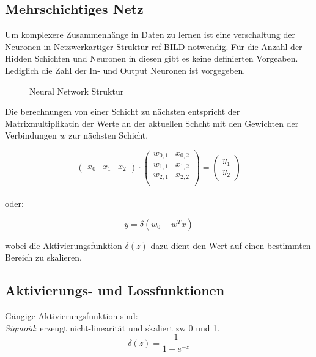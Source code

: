 \subsection{Mehrschichtiges Netz}

Um komplexere Zusammenhänge in Daten zu lernen ist eine verschaltung der Neuronen in Netzwerkartiger Struktur ref BILD
notwendig. Für die Anzahl der Hidden Schichten und Neuronen in diesen gibt es keine definierten Vorgeaben. Lediglich 
die Zahl der In- und Output Neuronen ist vorgegeben.

\begin{figure}
    \centering
    
    \caption{Neural Network Struktur}
    \label{fig:nn}
\end{figure}

Die berechnungen von einer Schicht zu nächsten entspricht der Matrixmultiplikatin der Werte an der aktuellen Schcht 
mit den Gewichten der Verbindungen $w$ zur nächsten Schicht.



\begin{equation}
    \label{mat:feedforward}
    \begin{pmatrix}
        x_{0} & x_{1} & x_{2}
    \end{pmatrix}
    \cdot
    \begin{pmatrix}
        w_{0,1} & x_{0,2}\\
        w_{1,1} & x_{1,2}\\
        w_{2,1} & x_{2,2}\\
    \end{pmatrix}
    =
    \begin{pmatrix}
        y_{1}\\
        y_{2}
    \end{pmatrix}
\end{equation}\\

oder:

\begin{equation}
    \label{eq:nn}
    y = \delta(w_{0} + w^{T}x)
\end{equation}

wobei die Aktivierungsfunktion $\delta(z)$ dazu dient den Wert auf einen bestimmten Bereich zu skalieren.\\

\subsection{Aktivierungs- und Lossfunktionen}
Gängige Aktivierungsfunktion sind:\\
\textit{Sigmoid}: erzeugt nicht-linearität und skaliert zw 0 und 1.
\begin{equation}
    \label{eq:sigm}
    \delta(z) = \frac{1}{1 + e^{-z}}
\end{equation}


